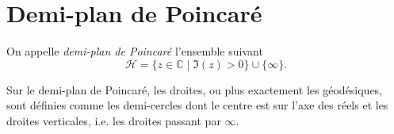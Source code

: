 \documentclass[..\main.tex]{subfiles}
\begin{document}
\section{Demi-plan de Poincaré}

\begin{definition}
    On appelle \emph{demi-plan de Poincaré} l'ensemble suivant
    \begin{equation}
        \mathcal{H} = \{ z \in \mathbb{C} \mid \Im(z) > 0 \}\cup \{\infty\}.
    \end{equation}
\end{definition}
Sur le demi-plan de Poincaré, les droites, ou plus exactement les géodésiques, 
sont définies comme les demi-cercles dont le centre est sur l'axe des réels et
les droites verticales, i.e. les droites passant par $\infty$.
\begin{figure}
\end{figure}
\end{document}
